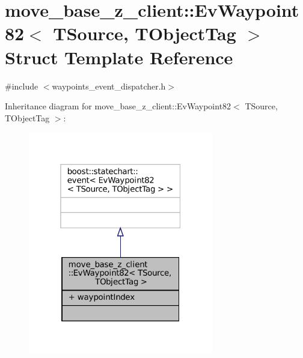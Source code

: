 \hypertarget{structmove__base__z__client_1_1EvWaypoint82}{}\section{move\+\_\+base\+\_\+z\+\_\+client\+:\+:Ev\+Waypoint82$<$ T\+Source, T\+Object\+Tag $>$ Struct Template Reference}
\label{structmove__base__z__client_1_1EvWaypoint82}


{\ttfamily \#include $<$waypoints\+\_\+event\+\_\+dispatcher.\+h$>$}



Inheritance diagram for move\+\_\+base\+\_\+z\+\_\+client\+:\+:Ev\+Waypoint82$<$ T\+Source, T\+Object\+Tag $>$\+:
\nopagebreak
\begin{figure}[H]
\begin{center}
\leavevmode
\includegraphics[width=229pt]{structmove__base__z__client_1_1EvWaypoint82__inherit__graph}
\end{center}
\end{figure}


